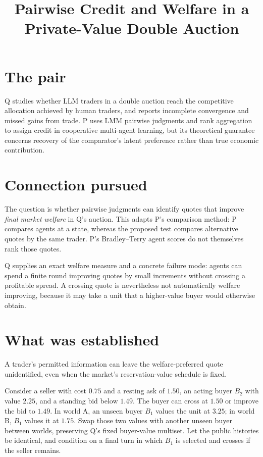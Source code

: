 \documentclass{article}
\title{Pairwise Credit and Welfare in a Private-Value Double Auction}
\begin{document}
\maketitle

\section{The pair}

Q studies whether LLM traders in a double auction reach the competitive allocation achieved by human traders, and reports incomplete convergence and missed gains from trade. P uses LMM pairwise judgments and rank aggregation to assign credit in cooperative multi-agent learning, but its theoretical guarantee concerns recovery of the comparator's latent preference rather than true economic contribution. 

\section{Connection pursued}

The question is whether pairwise judgments can identify quotes that improve \emph{final market welfare} in Q's auction. This adapts P's comparison method: P compares agents at a state, whereas the proposed test compares alternative quotes by the same trader. P's Bradley--Terry agent scores do not themselves rank those quotes. 

Q supplies an exact welfare measure and a concrete failure mode: agents can spend a finite round improving quotes by small increments without crossing a profitable spread. A crossing quote is nevertheless not automatically welfare improving, because it may take a unit that a higher-value buyer would otherwise obtain. 

\section{What was established}

\begin{claim}
A trader's permitted information can leave the welfare-preferred quote unidentified, even when the market's reservation-value schedule is fixed.
\end{claim}

Consider a seller with cost \(0.75\) and a resting ask of \(1.50\), an acting buyer \(B_2\) with value \(2.25\), and a standing bid below \(1.49\). The buyer can cross at \(1.50\) or improve the bid to \(1.49\). In world A, an unseen buyer \(B_1\) values the unit at \(3.25\); in world B, \(B_1\) values it at \(1.75\). Swap those two values with another unseen buyer between worlds, preserving Q's fixed buyer-value multiset. Let the public histories be identical, and condition on a final turn in which \(B_1\) is selected and crosses if the seller remains. 
\end{document}
